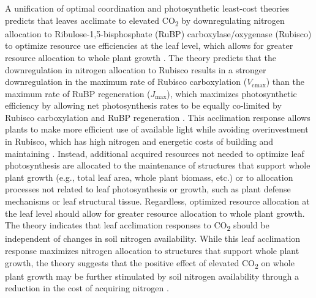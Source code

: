 A unification of optimal coordination and photosynthetic least-cost theories predicts that leaves acclimate to elevated CO\textsubscript{2} by downregulating nitrogen allocation to Ribulose-1,5-bisphosphate (RuBP) carboxylase/oxygenase (Rubisco) to optimize resource use efficiencies at the leaf level, which allows for greater resource allocation to whole plant growth . The theory predicts that the downregulation in nitrogen allocation to Rubisco results in a stronger downregulation in the maximum rate of Rubisco carboxylation ($V_\mathrm{cmax}$) than the maximum rate of RuBP regeneration ($J_\mathrm{max}$), which maximizes photosynthetic efficiency by allowing net photosynthesis rates to be equally co-limited by Rubisco carboxylation and RuBP regeneration . This acclimation response allows plants to make more efficient use of available light while avoiding overinvestment in Rubisco, which has high nitrogen and energetic costs of building and maintaining . Instead, additional acquired resources not needed to optimize leaf photosynthesis are allocated to the maintenance of structures that support whole plant growth (e.g., total leaf area, whole plant biomass, etc.) or to allocation processes not related to leaf photosynthesis or growth, such as plant defense mechanisms or leaf structural tissue. Regardless, optimized resource allocation at the leaf level should allow for greater resource allocation to whole plant growth. The theory indicates that leaf acclimation responses to CO\textsubscript{2} should be independent of changes in soil nitrogen availability. While this leaf acclimation response maximizes nitrogen allocation to structures that support whole plant growth, the theory suggests that the positive effect of elevated CO\textsubscript{2} on whole plant growth may be further stimulated by soil nitrogen availability through a reduction in the cost of acquiring nitrogen .

